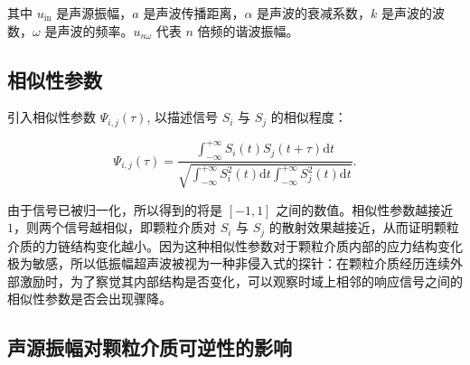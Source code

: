 其中 $u_{\text{in}}$ 是声源振幅，$a$ 是声波传播距离，$\alpha$ 是声波的衰减系数，$k$ 是声波的波数，$\omega$ 是声波的频率。$u_{n\omega}$ 代表 $n$ 倍频的谐波振幅。


\subsection{相似性参数}

引入相似性参数 $\Psi_{i,j}(\tau)$, 以描述信号 $S_{i}$ 与 $S_{j}$ 的相似程度\cite{PhysRevLett.90.174302}：

\begin{equation}
  \Psi_{i,j}(\tau) = \frac{\int_{-\infty}^{+\infty}S_{i}(t)S_{j}(t+\tau)\mathrm{d}t}{\sqrt{\int_{-\infty}^{+\infty}S_{i}^{2}(t)\mathrm{d}t\int_{-\infty}^{+\infty}S_{j}^{2}(t)\mathrm{d}t}}.
\end{equation}

由于信号已被归一化，所以得到的将是 $[-1,1]$ 之间的数值。相似性参数越接近 $1$，则两个信号越相似，即颗粒介质对 $S_{i}$ 与 $S_{j}$ 的散射效果越接近，从而证明颗粒介质的力链结构变化越小。因为这种相似性参数对于颗粒介质内部的应力结构变化极为敏感，所以低振幅超声波被视为一种非侵入式的探针：在颗粒介质经历连续外部激励时，为了察觉其内部结构是否变化，可以观察时域上相邻的响应信号之间的相似性参数是否会出现骤降。

\subsection{声源振幅对颗粒介质可逆性的影响}